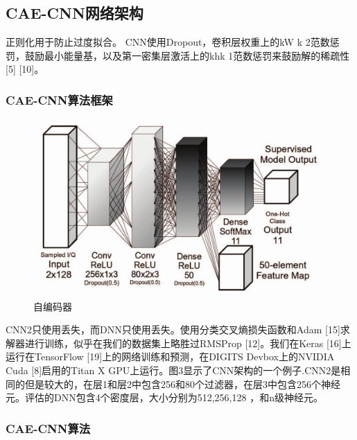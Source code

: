 \subsection{CAE-CNN网络架构}
正则化用于防止过度拟合。 CNN使用Dropout，卷积层权重上的kW k 2范数惩罚，鼓励最小能量基，以及第一密集层激活上的khk 1范数惩罚来鼓励解的稀疏性[5] [10]。 


\subsubsection{CAE-CNN算法框架}

\begin{figure}[!h]
	\centering
	\includegraphics[scale=0.3]{figures/chapter_3/cae_cnn_frame}
	\caption{自编码器}	\label{fig_3_2}
\end{figure}
CNN2只使用丢失，而DNN只使用丢失。使用分类交叉熵损失函数和Adam [15]求解器进行训练，似乎在我们的数据集上略胜过RMSProp [12]。我们在Keras [16]上运行在TensorFlow [19]上的网络训练和预测，在DIGITS Devbox上的NVIDIA Cuda [8]启用的Titan X GPU上运行。图3显示了CNN架构的一个例子.CNN2是相同的但是较大的，在层1和层2中包含256和80个过滤器，在层3中包含256个神经元。评估的DNN包含4个密度层，大小分别为512,256,128 ，和n级神经元。\par

\subsubsection{CAE-CNN算法}


